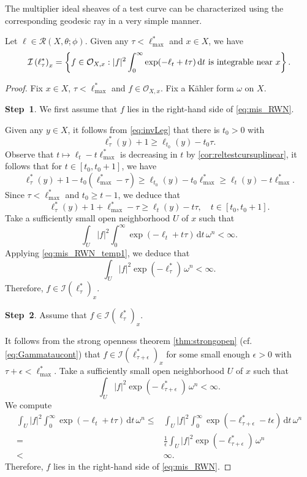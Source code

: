 The multiplier ideal sheaves of a test curve can be characterized using the corresponding geodesic ray in a very simple manner.
\begin{proposition}\label{prop:mis_RWN}
    Let $\ell\in \mathcal{R}(X,\theta;\phi)$. Given any $\tau<\ell^*_{\max}$ and $x\in X$, we have
    \begin{equation}\label{eq:mis_RWN}
    \mathcal{I}\left(\ell^*_{\tau}\right)_{x}=\left\{ f\in \mathcal{O}_{X,x}: |f|^2\int_0^{\infty} \exp(-\ell_t+t\tau)\,\mathrm{d}t \textup{ is integrable near }x \right\}.
    \end{equation}
\end{proposition}
\begin{proof}
    Fix $x\in X$, $\tau<\ell^*_{\max}$ and $f\in \mathcal{O}_{X,x}$. Fix a K\"ahler form $\omega$ on $X$.

    \textbf{Step~1}. We first assume that $f$ lies in the right-hand side of \eqref{eq:mis_RWN}.

    Given any $y\in X$, it follows from \eqref{eq:invLeg} that there is $t_0>0$ with
    \[
    \ell^*_{\tau}(y)+1\geq \ell_{t_0}(y)-t_0\tau.
    \]
    Observe that $t\mapsto \ell_t-t\ell^*_{\max}$ is decreasing in $t$ by \cref{cor:reltestcursuplinear}, it follows that for $t\in [t_0,t_0+1]$, we have
    \[
    \ell^*_{\tau}(y)+1-t_0(\ell^*_{\max}-\tau)\geq \ell_{t_0}(y)-t_0\ell^*_{\max}\geq \ell_{t}(y)-t\ell^*_{\max}.
    \]
    Since $\tau< \ell^*_{\max}$ and $t_0\geq t-1$, we deduce that
    \begin{equation}\label{eq:mis_RWN_temp1}
    \ell^*_{\tau}(y)+1+\ell^*_{\max}-\tau \geq \ell_{t}(y)-t\tau,\quad t\in [t_0,t_0+1].
    \end{equation}
    Take a sufficiently small open neighborhood $U$ of $x$ such that
    \[
    \int_U |f|^2\int_0^{\infty} \exp(-\ell_t+t\tau)\,\mathrm{d}t\,\omega^n<\infty.
    \]
    Applying \eqref{eq:mis_RWN_temp1}, we deduce that
    \[
    \int_U |f|^2\exp\left(-\ell^*_{\tau}\right)\,\omega^n<\infty.
    \]
    Therefore, $f\in \mathcal{I}(\ell^*_{\tau})_x$.

    \textbf{Step~2}. Assume that $f\in \mathcal{I}(\ell^*_{\tau})_x$.

    It follows from the strong openness theorem \cref{thm:strongopen} (cf. \eqref{eq:Gammataucont}) that $f\in \mathcal{I}(\ell^*_{\tau+\epsilon})_x$ for some small enough $\epsilon>0$ with $\tau+\epsilon<\ell^*_{\max}$.
    Take a sufficiently small open neighborhood $U$ of $x$ such that
    \[
    \int_U |f|^2 \exp\left(-\ell^*_{\tau+\epsilon}\right)\,\omega^n<\infty.
    \]
    We compute
    \[
    \begin{aligned}
    \int_U |f|^2\int_0^{\infty} \exp\left(-\ell_t+t\tau\right)\,\mathrm{d}t\,\omega^n\leq & \int_U |f|^2\int_0^{\infty} \exp\left(-\ell^*_{\tau+\epsilon}-t\epsilon\right)\,\mathrm{d}t\,\omega^n\\
    =&\frac{1}{\epsilon}\int_U |f|^2\exp\left(-\ell^*_{\tau+\epsilon}\right)\,\omega^n\\
    <&\infty.
    \end{aligned}
    \]
    Therefore, $f$ lies in the right-hand side of \eqref{eq:mis_RWN}.
\end{proof}

